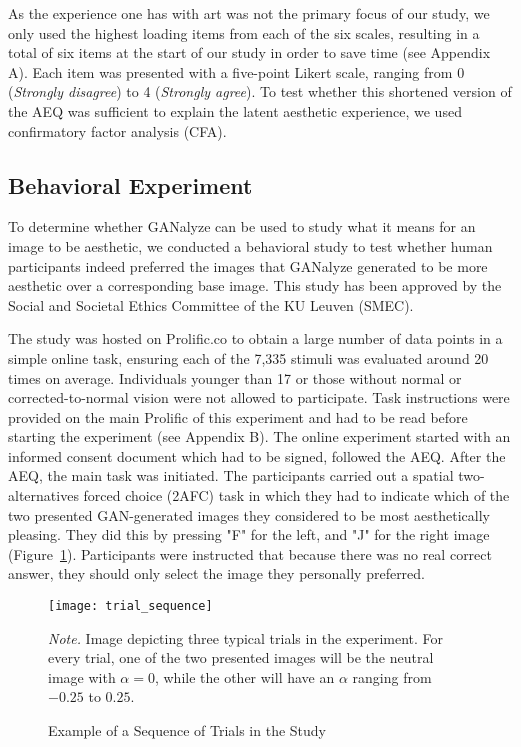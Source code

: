 \documentclass[../main.tex]{subfiles}
\begin{document}
As the experience one has with art was not the primary focus of our study, we only used the highest loading items from each of the six scales, resulting in a total of six items at the start of our study in order to save time (see Appendix A). Each item was presented with a five-point Likert scale, ranging from 0 (\textit{Strongly disagree}) to 4 (\textit{Strongly agree}). To test whether this shortened version of the AEQ was sufficient to explain the latent aesthetic experience, we used confirmatory factor analysis (CFA).
	
	
	
\subsection{Behavioral Experiment}
To determine whether GANalyze can be used to study what it means for an image to be aesthetic, we conducted a behavioral study to test whether human participants indeed preferred the images that GANalyze generated to be more aesthetic over a corresponding base image. This study has been approved by the Social and Societal Ethics Committee of the KU Leuven (SMEC).
	
The study was hosted on Prolific.co to obtain a large number of data points in a simple online task, ensuring each of the 7,335 stimuli was evaluated around 20 times on average. Individuals younger than 17 or those without normal or corrected-to-normal vision were not allowed to participate. Task instructions were provided on the main Prolific of this experiment and had to be read before starting the experiment (see Appendix B). The online experiment started with an informed consent document which had to be signed, followed the AEQ. After the AEQ, the main task was initiated. The participants carried out a spatial two-alternatives forced choice (2AFC) task in which they had to indicate which of the two presented GAN-generated images they considered to be most aesthetically pleasing. They did this by pressing "F" for the left, and "J" for the right image (Figure~\ref{fig:trial_sequence}). Participants were instructed that because there was no real correct answer, they should only select the image they personally preferred.

\begin{figure}[!h]
	\begin{center}
		\caption{Example of a Sequence of Trials in the Study}
		\label{fig:trial_sequence}
		\texttt{[image: trial\_sequence]}
	\end{center}
	\vfill
	{\normalfont \textit{Note.} Image depicting three typical trials in the experiment. For every trial, one of the two presented images will be the neutral image with $\alpha=0$, while the other will have an $\alpha$ ranging from $-0.25$ to $0.25$.}
\end{figure}
\end{document}

